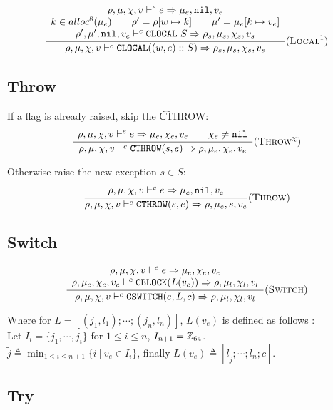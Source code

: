 \[\dfrac{\begin{array}{c}
    \rho,\mu,\chi,v \vdash^e e \Rightarrow \mu_e,\texttt{nil},v_e \\
    k \in alloc^8(\mu_e) \qquad \rho' = \rho[w \mapsto k] \qquad \mu' = \mu_e[k \mapsto v_e] \\
    \rho',\mu',\texttt{nil},v_e \vdash^c \texttt{CLOCAL}\ S \Rightarrow \rho_s,\mu_s,\chi_s,v_s
\end{array}}{\rho,\mu,\chi,v \vdash^c \texttt{CLOCAL}((w,e)::S) \Rightarrow \rho_s,\mu_s,\chi_s,v_s} (\textsc{Local}^1)\]

\subsection{Throw}
If a flag is already raised, skip the \t{CTHROW}:
\[\dfrac{\begin{array}{c}
    \rho,\mu,\chi,v \vdash^e e \Rightarrow \mu_e,\chi_e,v_e \qquad \chi_e\ne\texttt{nil}
\end{array}}{\rho,\mu,\chi,v \vdash^c \texttt{CTHROW}(s,e) \Rightarrow \rho,\mu_e,\chi_e,v_e} (\textsc{Throw}^\chi)\]

Otherwise raise the new exception \(s\in S\):
\[\dfrac{\begin{array}{c}
    \rho,\mu,\chi,v \vdash^e e \Rightarrow \mu_e,\texttt{nil},v_e
\end{array}}{\rho,\mu,\chi,v \vdash^c \texttt{CTHROW}(s,e) \Rightarrow \rho,\mu_e,s,v_e} (\textsc{Throw})\]

\subsection{Switch}

\[\dfrac{\begin{array}{c}
    \rho,\mu,\chi,v \vdash^e e \Rightarrow \mu_e,\chi_e,v_e \\
    \rho,\mu_e,\chi_e,v_e \vdash^c \texttt{CBLOCK}(L(v_e)) \Rightarrow \rho,\mu_l,\chi_l,v_l
\end{array}}{\rho,\mu,\chi,v \vdash^c \texttt{CSWITCH}(e, L, c) \Rightarrow \rho,\mu_l,\chi_l,v_l} (\textsc{Switch})\]

Where for \(L = [(j_1, l_1); \cdots; (j_n,l_n)]\), \(L(v_e)\) is defined as follows : \\
Let \(I_i =  \{ j_1, \cdots, j_i \}\) for \(1 \leq i \leq n\), \(I_{n+1} = \mathbb{Z}_{64}\). \\
\(\tilde{j} \triangleq \min_{1\leq i \leq n+1} \{ i\ |\ v_e\in I_i \}\), finally \(L(v_e) \triangleq [l_{\tilde{j}}; \cdots; l_n; c]\).

\subsection{Try}

